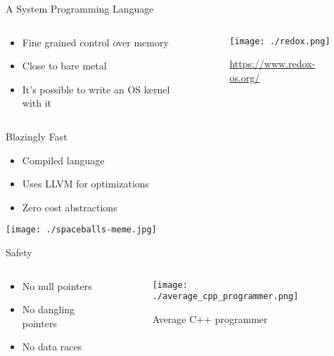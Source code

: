 \documentclass[aspectratio=1610,t]{beamer}
\begin{document}

\begin{frame}[c]{A System Programming Language}
  \begin{columns}[onlytextwidth]
    \begin{column}{.4\textwidth}
      \begin{itemize}
        \item Fine grained control over memory
        \item Close to bare metal
        \item It's possible to write an OS kernel with it
      \end{itemize}
    \end{column}
    \begin{column}{.6\textwidth}
      \begin{figure}
        \texttt{[image: ./redox.png]}
        \caption{\url{https://www.redox-os.org/}}
      \end{figure}
    \end{column}
  \end{columns}
\end{frame}


\begin{frame}[c]{Blazingly Fast}
  \begin{itemize}
    \item Compiled language
    \item Uses LLVM for optimizations
    \item Zero cost abstractions
  \end{itemize}
  \texttt{[image: ./spaceballs-meme.jpg]}
\end{frame}


\begin{frame}[c]{Safety}
  \begin{columns}[onlytextwidth]
    \begin{column}{.3\textwidth}
      \begin{itemize}
        \item No null pointers
        \item No dangling pointers
        \item No data races
      \end{itemize}
    \end{column}
    \begin{column}{.7\textwidth}
      \begin{figure}
        \texttt{[image: ./average\_cpp\_programmer.png]}
        \caption{Average C++ programmer}
      \end{figure}
    \end{column}
  \end{columns}
\end{frame}
\end{document}
